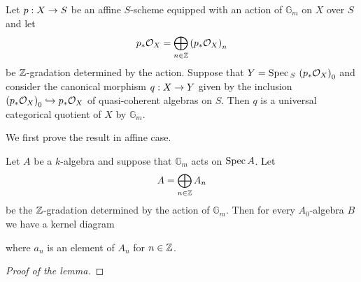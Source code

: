 \begin{theorem}\label{theorem:universal_categorical_quotients_for_multiplicative_group_exists_for_relatively_affine_schemes}
Let $p:X\rightarrow S$ be an affine $S$-scheme equipped with an action of $\mathbb{G}_m$ on $X$ over $S$ and let 
$$p_*{\mathcal O}_X = \bigoplus_{n\in {\mathbb Z}}\left(p_*{\mathcal O}_X\right)_n$$
be ${\mathbb Z}$-gradation determined by the action. Suppose that $Y = \mathrm{Spec}\,_S\,\left(p_*{\mathcal O}_X\right)_0$ and consider the canonical morphism $q:X \rightarrow Y$ given by the inclusion $\left(p_*{\mathcal O}_X\right)_0 \hookrightarrow p_*{\mathcal O}_X$ of quasi-coherent algebras on $S$. Then $q$ is a universal categorical quotient of $X$ by $\mathbb{G}_m$.
\end{theorem}
\noindent
We first prove the result in affine case.

\begin{lemma}
Let $A$ be a $k$-algebra and suppose that $\mathbb{G}_m$ acts on $\mathrm{Spec}\, A$. Let 
$$A = \bigoplus_{n\in {\mathbb Z}}A_n$$
be the ${\mathbb Z}$-gradation determined by the action of $\mathbb{G}_m$. Then for every $A_0$-algebra $B$ we have a kernel diagram
\begin{center}
\end{center}
where $a_n$ is an element of $A_n$ for $n\in {\mathbb Z}$.
\end{lemma}
\begin{proof}[Proof of the lemma]
\end{proof}































































\small



